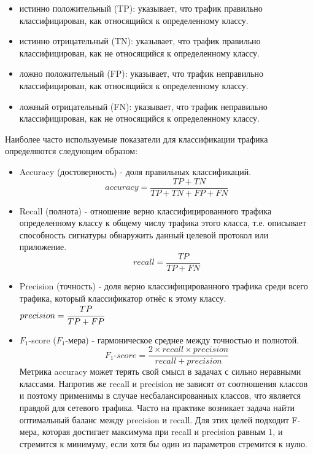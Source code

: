 \begin{itemize}
    \item истинно положительный (TP): указывает, что трафик правильно классифицирован, как относящийся к определенному классу.
    \item истинно отрицательный (TN): указывает, что трафик правильно классифицирован, как не относящийся к определенному классу.
    \item ложно положительный (FP): указывает, что трафик неправильно классифицирован, как относящийся к определенному классу.
    \item ложный отрицательный (FN): указывает, что трафик неправильно классифицирован, как не относящийся к определенному классу.
\end{itemize}

Наиболее часто используемые показатели для классификации трафика определяются следующим образом:

\begin{itemize}
    \item Accuracy (достоверность) - доля правильных классификаций.
    $$ accuracy = \dfrac{TP + TN}{TP + TN + FP + FN} $$

    \item Recall (полнота) - отношение верно классифицированного трафика определенному классу к общему числу трафика этого класса,
    т.е. описывает способность сигнатуры обнаружить данный целевой протокол или приложение.
    $$ recall = \dfrac{TP}{TP + FN} $$

    \item Precision (точность) - доля верно классифицированного трафика среди всего трафика, который классификатор отнёс к этому классу.
    $ precision = \cfrac{TP}{TP + FP}$

    \item $F_1$-score ($F_1$-мера) - гармоническое среднее между точностью и полнотой.
     $$ \textit{$F_1$-score} = \dfrac{2 \times recall \times precision}{recall + precision} $$
    Метрика accuracy может терять свой смысл в задачах с сильно неравными классами.
    Напротив же recall и precision не зависят от соотношения классов и поэтому применимы в случае несбалансированных классов,
    что является правдой для сетевого трафика. Часто на практике возникает задача найти оптимальный баланс между precision
    и recall. Для этих целей подходит F-мера, которая достигает максимума при recall
    и precision равным 1, и стремится к минимуму, если хотя бы один из параметров стремится к нулю.


\end{itemize}

